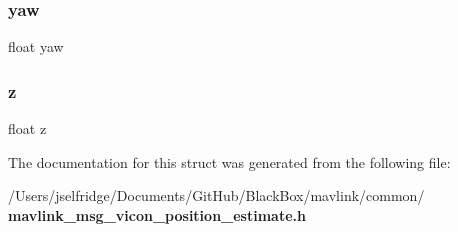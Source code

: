 \subsubsection{yaw}
{\footnotesize\ttfamily float yaw}

\mbox{\label{struct____mavlink__vicon__position__estimate__t_af73583b1e980b0aa03f9884812e9fd4d}} 
\subsubsection{z}
{\footnotesize\ttfamily float z}



The documentation for this struct was generated from the following file\+:\begin{DoxyCompactItemize}
\item 
/\+Users/jselfridge/\+Documents/\+Git\+Hub/\+Black\+Box/mavlink/common/\textbf{ mavlink\+\_\+msg\+\_\+vicon\+\_\+position\+\_\+estimate.\+h}\end{DoxyCompactItemize}
